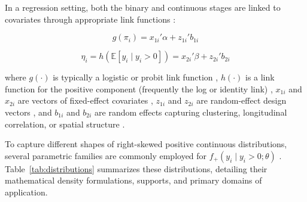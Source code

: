 \documentclass[11pt, a4paper]{article}
\begin{document}
In a regression setting, both the binary and continuous stages are linked to covariates through appropriate link functions \cite{ref4, ref8}:

\begin{equation}
g(\pi_i) = x_{1i}' \alpha + z_{1i}' b_{1i}
\end{equation}

\begin{equation}
\eta_i = h(\mathbb{E}[y_i \mid y_i > 0]) = x_{2i}' \beta + z_{2i}' b_{2i}
\end{equation}

where $g(\cdot)$ is typically a logistic or probit link function \cite{ref1, ref6}, $h(\cdot)$ is a link function for the positive component (frequently the log or identity link) \cite{ref6, ref8, ref17}, $x_{1i}$ and $x_{2i}$ are vectors of fixed-effect covariates \cite{ref1}, $z_{1i}$ and $z_{2i}$ are random-effect design vectors \cite{ref1, ref6}, and $b_{1i}$ and $b_{2i}$ are random effects capturing clustering, longitudinal correlation, or spatial structure \cite{ref1, ref15}.

To capture different shapes of right-skewed positive continuous distributions, several parametric families are commonly employed for $f_+(y_i \mid y_i > 0; \theta)$ \cite{ref3, ref4, ref6}. Table~\ref{tab:distributions} summarizes these distributions, detailing their mathematical density formulations, supports, and primary domains of application.
\end{document}
